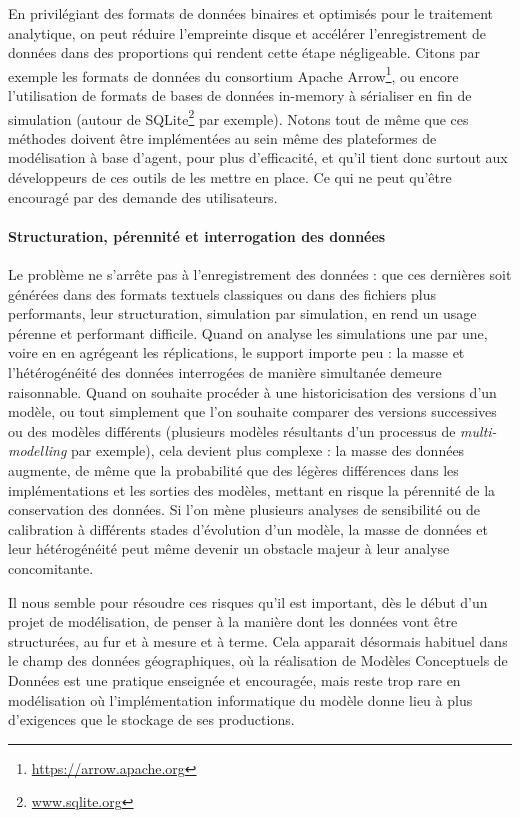 \documentclass[a4paper, 12pt]{article}
\begin{document}
En privilégiant des formats de données binaires et optimisés pour le traitement analytique, on peut réduire l'empreinte disque et accélérer l'enregistrement de données dans des proportions qui rendent cette étape négligeable.
Citons par exemple les formats de données du consortium \textsf{Apache Arrow}\footnote{
\href{https://arrow.apache.org}{https://arrow.apache.org}
}, ou encore l'utilisation de formats de bases de données \og in-memory\fg{} à sérialiser en fin de simulation (autour de \textsf{SQLite}\footnote{
\href{https://www.sqlite.org}{www.sqlite.org}
} par exemple).
Notons tout de même que ces méthodes doivent être implémentées au sein même des plateformes de modélisation à base d'agent, pour plus d'efficacité, et qu'il tient donc surtout aux développeurs de ces outils de les mettre en place. Ce qui ne peut qu'être encouragé par des demande des utilisateurs.

\paragraph{Structuration, pérennité et interrogation des données}
Le problème ne s'arrête pas à l'enregistrement des données : que ces dernières soit générées dans des formats textuels classiques ou dans des fichiers plus performants, leur structuration, simulation par simulation, en rend un usage pérenne et performant difficile.
Quand on analyse les simulations une par une, voire en en agrégeant les réplications, le support importe peu : la masse et l'hétérogénéité des données interrogées de manière simultanée demeure raisonnable.
Quand on souhaite procéder à une historicisation des versions d'un modèle, ou tout simplement que l'on souhaite comparer des versions successives ou des modèles différents (plusieurs modèles résultants d'un processus de \textit{multi-modelling} par exemple), cela devient plus complexe : la masse des données augmente, de même que la probabilité que des légères différences dans les implémentations et les sorties des modèles, mettant en risque la pérennité de la conservation des données.
Si l'on mène plusieurs analyses de sensibilité ou de calibration à différents stades d'évolution d'un modèle, la masse de données et leur hétérogénéité peut même devenir un obstacle majeur à leur analyse concomitante.

Il nous semble pour résoudre ces risques qu'il est important, dès le début d'un projet de modélisation, de penser à la manière dont les données vont être structurées, au fur et à mesure et à terme.
Cela apparait désormais habituel dans le champ des données géographiques, où la réalisation de \og Modèles Conceptuels de Données\fg{} est une pratique enseignée et encouragée, mais reste trop rare en modélisation où l'implémentation informatique du modèle donne lieu à plus d'exigences que le stockage de ses productions.
\end{document}
